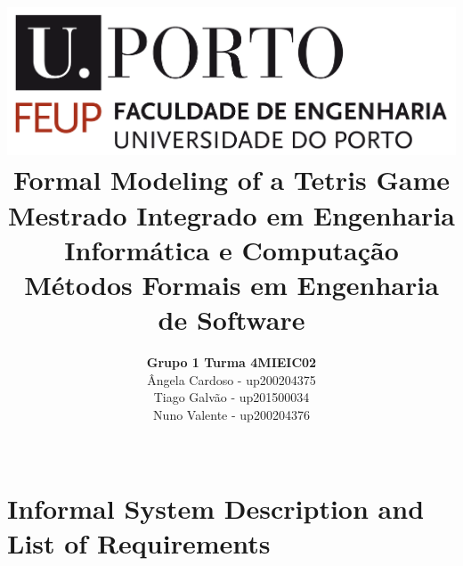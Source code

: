 \documentclass[a4paper]{article}
\begin{document}


\title{\includegraphics[scale=0.15]{resources/img/feup_logo.png}
\linebreak\linebreak\linebreak\linebreak\linebreak
\Huge\textbf{Formal Modeling of a Tetris Game }\linebreak\linebreak
\linebreak\linebreak
\Large{Mestrado Integrado em Engenharia Informática e Computação} \linebreak\linebreak
\Large{Métodos Formais em Engenharia de Software}\linebreak\linebreak
}
\author{\textbf{Grupo 1 Turma 4MIEIC02}\\
Ângela Cardoso - up200204375\\
Tiago Galvão - up201500034\\
Nuno Valente - up200204376\\
\linebreak\linebreak \\
\linebreak\linebreak\linebreak
\linebreak\linebreak\vspace{1cm}}

\maketitle

\thispagestyle{empty}
\newpage
\tableofcontents 
\newpage

\section{Informal System Description and List of Requirements}
\end{document}
